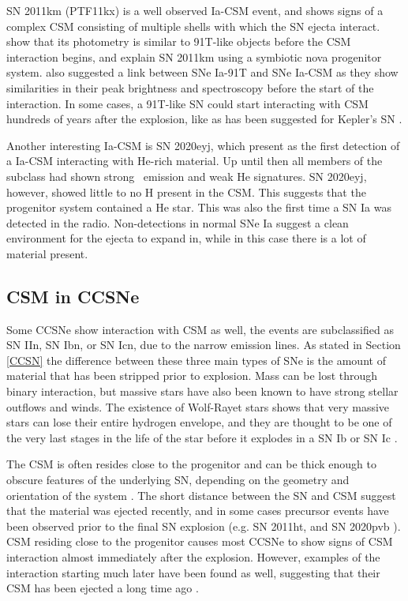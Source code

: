 \documentclass[a4paper,oneside,12pt, class=Latex/Classes/PhDthesisPSnPDF, crop=false]{standalone}
\begin{document}
SN 2011km (PTF11kx) is a well observed Ia-CSM event, and shows signs of a complex CSM consisting of multiple shells with which the SN ejecta interact. \citet{ptf11kx} show that its photometry is similar to 91T-like objects before the CSM interaction begins, and explain SN 2011km using a symbiotic nova progenitor system. \citet{Ia-CSM_and_91T_connection} also suggested a link between SNe Ia-91T and SNe Ia-CSM as they show  similarities in their peak brightness and spectroscopy before the start of the interaction. In some cases, a 91T-like SN could start interacting with CSM hundreds of years after the explosion, like as has been suggested for Kepler’s SN \citet{Kepler_91T, Kepler_CSM}.

Another interesting Ia-CSM is SN 2020eyj, which \citet{Kool_He_CSM} present as the first detection of a Ia-CSM interacting with He-rich material. Up until then all members of the subclass had shown strong \Halpha\ emission and weak He signatures. SN 2020eyj, however, showed little to no H present in the CSM. This suggests that the progenitor system contained a He star. This was also the first time a SN Ia was detected in the radio. Non-detections in normal SNe Ia suggest a clean environment for the ejecta to expand in, while in this case there is a lot of material present.


\subsection{CSM in CCSNe}
Some CCSNe show interaction with CSM as well, the events are subclassified as SN IIn, SN Ibn, or SN Icn, due to the narrow emission lines. As stated in Section \ref{CCSN} the difference between these three main types of SNe is the amount of material that has been stripped prior to explosion. Mass can be lost through binary interaction, but massive stars have also been known to have strong stellar outflows and winds. The existence of Wolf-Rayet stars shows that very massive stars can lose their entire hydrogen envelope, and they are thought to be one of the very last stages in the life of the star before it explodes in a SN Ib or SN Ic \citep{WR_as_progenitors, 2019hgp}.

The CSM is often resides close to the progenitor and can be thick enough to obscure features of the underlying SN, depending on the geometry and orientation of the system \citep{1994W, PTF11iqb}. The short distance between the SN and CSM suggest that the material was ejected recently, and in some cases precursor events have been observed prior to the final SN explosion (e.g. SN 2011ht, \citealt{2011ht} and SN 2020pvb \citealt{2020pvb}). CSM residing close to the progenitor causes most CCSNe to show signs of CSM interaction almost immediately after the explosion. However, examples of the interaction starting much later have been found as well, suggesting that their CSM has been ejected a long time ago \citep{2008iy, late-CSM_IIn_Spitzer}.
\end{document}
